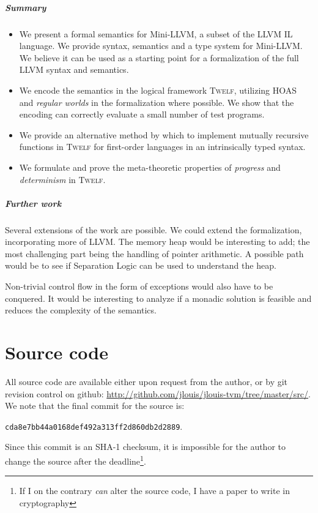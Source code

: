 \documentclass[a4paper, oneside, 10pt, draft]{memoir}
\newcommand{\twelf}{\textsc{Twelf}}
\begin{document}
\paragraph{Summary}
\begin{itemize}
\item We present a formal semantics for Mini-LLVM, a subset of the
  LLVM IL language. We provide syntax, semantics and a type system for
  Mini-LLVM. We believe it can be used as a starting point for a
  formalization of the full LLVM syntax and semantics.
\item We encode the semantics in the logical framework \twelf{},
  utilizing HOAS and \emph{regular worlds} in the formalization where
  possible. We show that the encoding can correctly evaluate a small
  number of test programs.
\item We provide an alternative method by which to implement mutually
  recursive functions in \twelf{} for first-order languages in an
  intrinsically typed syntax.
\item We formulate and prove the meta-theoretic properties of
  \emph{progress} and \emph{determinism} in \twelf{}.
\end{itemize}
\paragraph{Further work}

Several extensions of the work are possible. We could extend the
formalization, incorporating more of LLVM. The memory heap would be
interesting to add; the most challenging part being the handling of
pointer arithmetic. A possible path would be to see if Separation
Logic\cite{reynolds:2002:separationlogic} can be used to understand
the heap.

Non-trivial control flow in the form of exceptions would also have to
be conquered. It would be interesting to analyze if a monadic solution
is feasible and reduces the complexity of the semantics.





\appendix
\chapter{Source code}
All source code are available either upon request from the author, or
by git revision control on github:
\url{http://github.com/jlouis/jlouis-tvm/tree/master/src/}. We note
that the final commit for the source is:
\begin{center}
  \texttt{cda8e7bb44a0168def492a313ff2d860db2d2889}.
\end{center}
Since this commit is an SHA-1 checksum, it is impossible for the
author to change the source after the deadline\footnote{If I on the
  contrary \emph{can} alter the source code, I have a paper to write
  in cryptography}.
\end{document}
